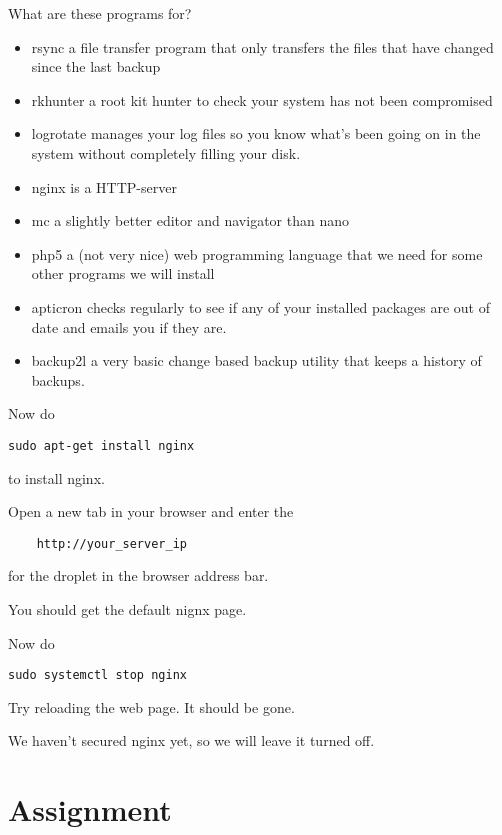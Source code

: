 \documentclass[12pt,a4paper]{article}
\begin{document}
What are these programs for?
\begin{itemize}
 \item{rsync} a file transfer program that only transfers the files that have changed  since the last backup
 \item rkhunter a root kit hunter to check your system has not been compromised

 \item logrotate manages your log files so you know what’s been going on in the system without completely filling your disk.
 \item nginx is a HTTP-server   
 \item mc a slightly better editor and navigator than nano
 \item php5 a (not very nice) web programming language that we need for some other programs we will install
 \item apticron checks regularly to see if any of your installed packages are out of date and emails you if they are.

 \item backup2l a very basic change based backup utility that keeps a history of backups.
 


\end{itemize}



Now do 

\begin{lstlisting}
sudo apt-get install nginx
\end{lstlisting}

to install nginx.

Open a new tab in your browser and enter the \begin{lstlisting}
	http://your_server_ip
\end{lstlisting} for the droplet in the browser address bar.

You should get the default nignx page.

Now do

\begin{lstlisting}
sudo systemctl stop nginx

\end{lstlisting}

Try reloading the web page. It should be gone.

We haven’t secured nginx yet, so we will leave it turned off.


\section*{Assignment}
\end{document}
